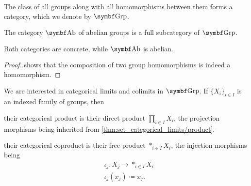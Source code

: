 \begin{definition}\label{def:category_of_groups}
  The class of all groups along with all homomorphisms between them forms a category, which we denote by \( \Bold{Grp} \).

  The category \( \Bold{Ab} \) of abelian groups is a full subcategory of \( \Bold{Grp} \).

  Both categories are concrete, while \( \Bold{Ab} \) is abelian.
\end{definition}
\begin{proof}
   shows that the composition of two group homomorphisms is indeed a homomorphism.
\end{proof}

\begin{proposition}\label{thm:group_categorical_limits}
  We are interested in categorical limits and colimits in \( \Bold{Grp} \). If \( \{ X_i \}_{i \in I} \) is an indexed family of groups, then
  \begin{defenum}
     their categorical product is their direct product \( \prod_{i \in I} X_i \), the projection morphisms being inherited from \cref{thm:set_categorical_limits/product}.

     their categorical coproduct is their free product \( \ast_{i \in I} X_i \), the injection morphisms being
    \begin{align*}
      &\iota_j: X_j \to \ast_{i \in I} X_i \\
      &\iota_j(x_j) \coloneqq x_j.
    \end{align*}
  \end{defenum}
\end{proposition}

